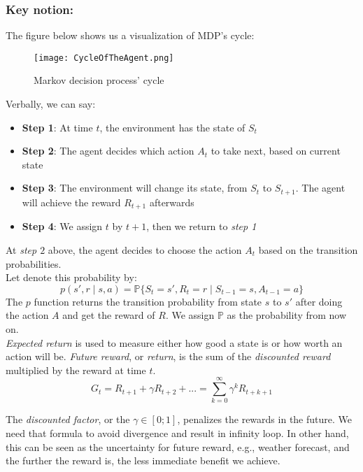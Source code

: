 \documentclass{article}
\begin{document}
\subsubsection*{Key notion:}
The figure below shows us a visualization of MDP's cycle:
\begin{figure}[h!]
\centering
\texttt{[image: CycleOfTheAgent.png]}
\caption{Markov decision process' cycle}
\end{figure}

Verbally, we can say:
\begin{itemize}
    \item \textbf{Step 1}: At time \textbf{$t$}, the environment has the state of \textbf{$S_t$}
    \item \textbf{Step 2}: The agent decides which action \textbf{$A_t$} to take next, based on current state
    \item \textbf{Step 3}: The environment will change its state, from \textbf{${S_t}$} to \textbf{$S_{t+1}$}. The agent will achieve the reward \textbf{$R_{t+1}$} afterwards
    \item \textbf{Step 4}: We assign $t$ by $t + 1$, then we return to \textit{step 1}
\end{itemize}
At \textit{step $2$} above, the agent decides to choose the action $A_t$ based on the transition probabilities.\\
Let denote this probability by:\\
\begin{equation}
\label{probability}
p(s', r \mid s, a) = \mathbb{P}\{S_t = s', R_t = r \mid S_{t-1} = s, A_{t-1} = a\} \nonumber
\end{equation}
The $p$ function returns the transition probability from state $s$ to $s'$ after doing the action $A$ and get the reward of $R$. We assign $\mathbb{P}$ as the probability from now on.\\

\textit{Expected return} is used to measure either how good a state is or how worth an action will be. \textit{Future reward}, or \textit{return}, is the sum of the \textit{discounted reward} multiplied by the reward at time $t$.
\begin{equation}
G_t = R_{t+1} + \gamma R_{t+2} + ... = \sum_{k = 0}^{\infty}\gamma^kR_{t+k+1}  
\end{equation}

The \textit{discounted factor}, or the $\gamma \in \left[0; 1\right]$, penalizes the rewards in the future. We need that formula to avoid divergence and result in infinity loop. In other hand, this can be seen as the uncertainty for future reward, e.g., weather forecast, and the further the reward is, the less immediate benefit we achieve.\\
\end{document}
